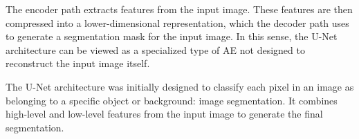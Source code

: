 The encoder path extracts features from the input image. These features are then compressed into a lower-dimensional representation, which the decoder path uses to generate a segmentation mask for the input image. In this sense, the U-Net architecture can be viewed as a specialized type of \ac{AE} not designed to reconstruct the input image itself.

The U-Net architecture was initially designed to classify each pixel in an image as belonging to a specific object or background: image segmentation. It combines high-level and low-level features from the input image to generate the final segmentation.